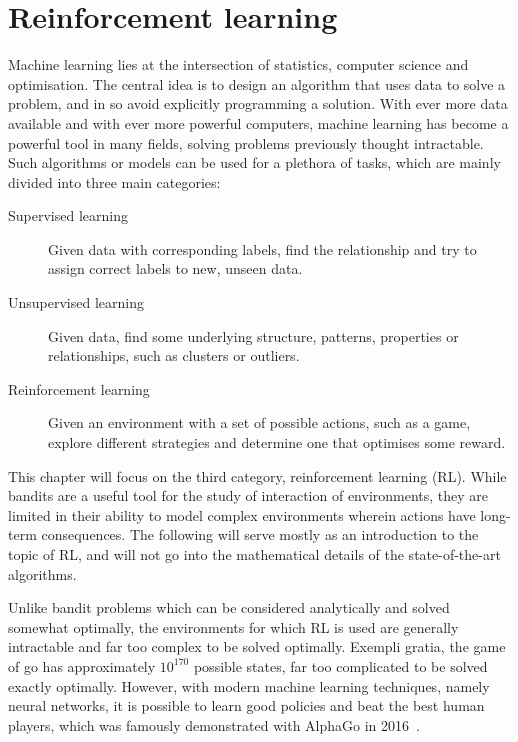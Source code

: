 \chapter{Reinforcement learning}
\label{chap:rl}

Machine learning lies at the intersection of statistics, computer science and optimisation.
The central idea is to design an algorithm that uses data to solve a problem, and in so avoid explicitly programming a solution.
With ever more data available and with ever more powerful computers, machine learning has become a powerful tool in many fields, solving problems previously thought intractable.
Such algorithms or models can be used for a plethora of tasks, which are mainly divided into three main categories:
\begin{description}

    \item[Supervised learning]
        Given data with corresponding labels, find the relationship and try to assign correct labels to new, unseen data.

    \item[Unsupervised learning]
        Given data, find some underlying structure, patterns, properties or relationships, such as clusters or outliers.

    \item[Reinforcement learning]
        Given an environment with a set of possible actions, such as a game, explore different strategies and determine one that optimises some reward.

\end{description}

This chapter will focus on the third category, reinforcement learning (RL).
While bandits are a useful tool for the study of interaction of environments, they are limited in their ability to model complex environments wherein actions have long-term consequences.
The following will serve mostly as an introduction to the topic of RL, and will not go into the mathematical details of the state-of-the-art algorithms.

Unlike bandit problems which can be considered analytically and solved somewhat optimally, the environments for which RL is used are generally intractable and far too complex to be solved optimally.
Exempli gratia, the game of go has approximately $10^{170}$ possible states, far too complicated to be solved exactly optimally.
However, with modern machine learning techniques, namely neural networks, it is possible to learn good policies and beat the best human players, which was famously demonstrated with AlphaGo in 2016~\autocite{silver2016}.

